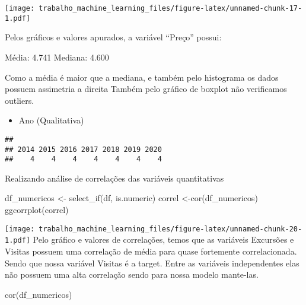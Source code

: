 \documentclass[
]{article}
\newenvironment{Shaded}{\begin{snugshade}}{\end{snugshade}}
\newcommand{\FunctionTok}[1]{\textcolor[rgb]{0.00,0.00,0.00}{#1}}
\newcommand{\NormalTok}[1]{#1}
\newcommand{\OtherTok}[1]{\textcolor[rgb]{0.56,0.35,0.01}{#1}}
\newcommand{\SpecialCharTok}[1]{\textcolor[rgb]{0.00,0.00,0.00}{#1}}
\providecommand{\tightlist}{%
  \setlength{\itemsep}{0pt}\setlength{\parskip}{0pt}}
\begin{document}
\texttt{[image: trabalho\_machine\_learning\_files/figure-latex/unnamed-chunk-17-1.pdf]}

Pelos gráficos e valores apurados, a variável ``Preço'' possui:

Média: 4.741 Mediana: 4.600

Como a média é maior que a mediana, e também pelo histograma os dados
possuem assimetria a direita Também pelo gráfico de boxplot não
verificamos outliers.

\begin{itemize}
\tightlist
\item
  Ano (Qualitativa)
\end{itemize}

\begin{Shaded}
\end{Shaded}

\begin{verbatim}
## 
## 2014 2015 2016 2017 2018 2019 2020 
##    4    4    4    4    4    4    4
\end{verbatim}

Realizando análise de correlações das variáveis quantitativas

\begin{Shaded}
\begin{Highlighting}[]
\NormalTok{df\_numericos }\OtherTok{\textless{}{-}} \FunctionTok{select\_if}\NormalTok{(df, is.numeric)}
\NormalTok{correl }\OtherTok{\textless{}{-}}\FunctionTok{cor}\NormalTok{(df\_numericos)}
\FunctionTok{ggcorrplot}\NormalTok{(correl)}
\end{Highlighting}
\end{Shaded}

\texttt{[image: trabalho\_machine\_learning\_files/figure-latex/unnamed-chunk-20-1.pdf]}
Pelo gráfico e valores de correlações, temos que as variáveis Excursões
e Visitas possuem uma correlação de média para quase fortemente
correlacionada. Sendo que nossa variável Visitas é a target. Entre as
variáveis independentes elas não possuem uma alta correlação sendo para
nossa modelo mante-las.

\begin{Shaded}
\begin{Highlighting}[]
\FunctionTok{cor}\NormalTok{(df\_numericos)}
\end{Highlighting}
\end{Shaded}
\end{document}
